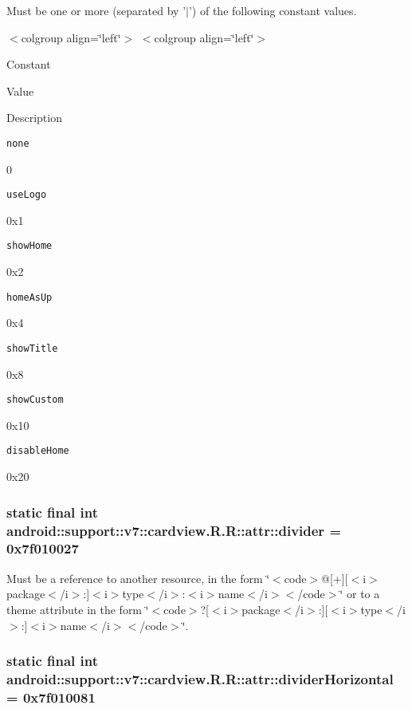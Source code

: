 Must be one or more (separated by '$|$') of the following constant values. \begin{TabularC}{0}
\hline
\end{TabularC}
$<$colgroup align=\char`\"{}left\char`\"{}$>$ $<$colgroup align=\char`\"{}left\char`\"{}$>$ 

Constant

Value

Description 

{\tt none}

0

{\tt useLogo}

0x1

{\tt showHome}

0x2

{\tt homeAsUp}

0x4

{\tt showTitle}

0x8

{\tt showCustom}

0x10

{\tt disableHome}

0x20\hypertarget{classandroid_1_1support_1_1v7_1_1cardview_1_1_r_1_1attr_a48d93b3f1c408433f07ffcf19f4b530}{
\subsubsection[{divider}]{\setlength{\rightskip}{0pt plus 5cm}static final int android::support::v7::cardview.R.R::attr::divider = 0x7f010027}}
\label{classandroid_1_1support_1_1v7_1_1cardview_1_1_r_1_1attr_a48d93b3f1c408433f07ffcf19f4b530}


Must be a reference to another resource, in the form \char`\"{}$<$code$>$@\mbox{[}+\mbox{]}\mbox{[}$<$i$>$package$<$/i$>$:\mbox{]}$<$i$>$type$<$/i$>$:$<$i$>$name$<$/i$>$$<$/code$>$\char`\"{} or to a theme attribute in the form \char`\"{}$<$code$>$?\mbox{[}$<$i$>$package$<$/i$>$:\mbox{]}\mbox{[}$<$i$>$type$<$/i$>$:\mbox{]}$<$i$>$name$<$/i$>$$<$/code$>$\char`\"{}. \hypertarget{classandroid_1_1support_1_1v7_1_1cardview_1_1_r_1_1attr_9ad9b01f29b0a318ae1a7f48b278cc89}{
\subsubsection[{dividerHorizontal}]{\setlength{\rightskip}{0pt plus 5cm}static final int android::support::v7::cardview.R.R::attr::dividerHorizontal = 0x7f010081}}
\label{classandroid_1_1support_1_1v7_1_1cardview_1_1_r_1_1attr_9ad9b01f29b0a318ae1a7f48b278cc89}


